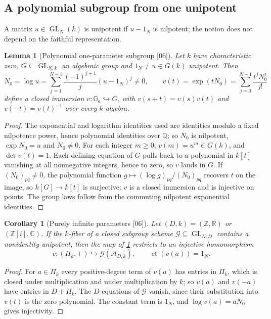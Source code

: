 \documentclass[11pt,oneside]{article}
\numberwithin{equation}{section}
\newtheorem{lemma}[lemma]{Lemma}
\newtheorem{corollary}[corollary]{Corollary}
\theoremstyle{definition}
\theoremstyle{remark}
\newcommand{\Z}{\mathbb Z}
\newcommand{\Q}{\mathbb Q}
\newcommand{\R}{\mathbb R}
\newcommand{\C}{\mathbb C}
\newcommand{\A}{\mathcal A}
\newcommand{\cG}{\mathcal G}
\newcommand{\Ga}{\mathbb G_a}
\newcommand{\ct}{\operatorname{ct}}
\newcommand{\GL}{\operatorname{GL}}
\newcommand{\src}[1]{\textup{\textsf{\small[#1]}}}
\begin{document}
\subsection{A polynomial subgroup from one unipotent}

A matrix $u\in\GL_N(k)$ is unipotent if $u-1_N$ is nilpotent; the notion does
not depend on the faithful representation.

\begin{lemma}[Polynomial one-parameter subgroup \src{06}]\label{ogl:alg:lem:exp}
Let $k$ have characteristic zero, $G\subseteq\GL_{N,k}$ an algebraic group
and $1_N\ne u\in G(k)$ unipotent. Then
\[
 N_0=\log u=\sum_{j=1}^{N-1}\frac{(-1)^{j+1}}j(u-1_N)^j\ne0,\qquad
 v(t)=\exp(tN_0)=\sum_{j=0}^{N-1}\frac{t^jN_0^j}{j!}
\]
define a closed immersion $v:\Ga\hookrightarrow G$, with $v(s+t)=v(s)v(t)$ and
$v(-t)=v(t)^{-1}$ over every $k$-algebra.
\end{lemma}
\begin{proof}
The exponential and logarithm identities used are identities modulo a fixed
nilpotence power, hence polynomial identities over $\Q$; so $N_0$ is nilpotent,
$\exp N_0=u$ and $N_0\ne0$. For each integer $m\ge0$, $v(m)=u^m\in G(k)$, and
$\det v(t)=1$. Each defining equation of $G$ pulls back to a polynomial in
$k[t]$ vanishing at all nonnegative integers, hence to zero, so $v$ lands in
$G$. If $(N_0)_{pq}\ne0$, the polynomial function
$g\mapsto(\log g)_{pq}/(N_0)_{pq}$ recovers $t$ on the image, so
$k[G]\to k[t]$ is surjective: $v$ is a closed immersion and is injective on
points. The group laws follow from the commuting nilpotent exponential
identities.
\end{proof}

\begin{corollary}[Purely infinite parameters \src{06}]\label{ogl:alg:cor:expI}
Let $(D,k)=(\Z,\R)$ or $(\Z[i],\C)$. If the $k$-fiber of a closed subgroup
scheme $\cG\subseteq\GL_{N,D}$ contains a nonidentity unipotent, then the map
of \cref{ogl:alg:lem:exp} restricts to an injective homomorphism
\[
 v:(\Pi_k,+)\hookrightarrow\cG(\A_{D,k}),\qquad \ct(v(a))=1_N .
\]
\end{corollary}
\begin{proof}
For $a\in\Pi_k$ every positive-degree term of $v(a)$ has entries in $\Pi_k$,
which is closed under multiplication and under multiplication by $k$; so
$v(a)$ and $v(-a)$ have entries in $D+\Pi_k$. The $D$-equations of $\cG$
vanish, since their substitution into $v(t)$ is the zero polynomial. The
constant term is $1_N$, and $\log v(a)=aN_0$ gives injectivity.
\end{proof}
\end{document}
